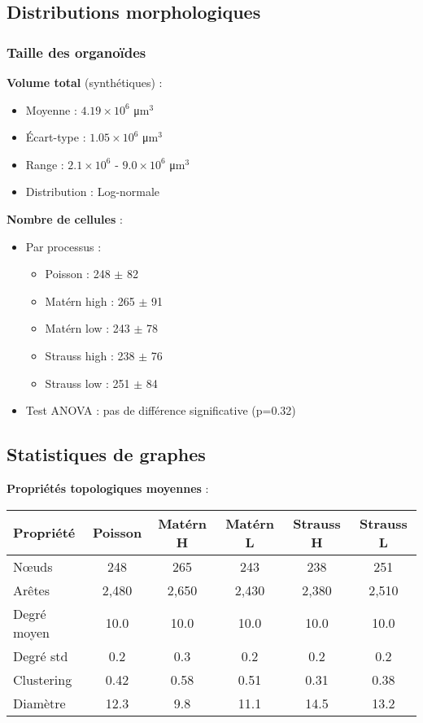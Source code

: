 \subsection{Distributions morphologiques}

\subsubsection{Taille des organoïdes}

\textbf{Volume total} (synthétiques) :
\begin{itemize}
    \item Moyenne : $4.19 \times 10^6$ μm$^3$
    \item Écart-type : $1.05 \times 10^6$ μm$^3$
    \item Range : $2.1 \times 10^6$ - $9.0 \times 10^6$ μm$^3$
    \item Distribution : Log-normale
\end{itemize}

\textbf{Nombre de cellules} :
\begin{itemize}
    \item Par processus :
        \begin{itemize}
            \item Poisson : 248 $\pm$ 82
            \item Matérn high : 265 $\pm$ 91
            \item Matérn low : 243 $\pm$ 78
            \item Strauss high : 238 $\pm$ 76
            \item Strauss low : 251 $\pm$ 84
        \end{itemize}
    \item Test ANOVA : pas de différence significative (p=0.32)
\end{itemize}

\subsection{Statistiques de graphes}

\textbf{Propriétés topologiques moyennes} :

\begin{tabular}{lccccc}
\hline
Propriété & Poisson & Matérn H & Matérn L & Strauss H & Strauss L \\
\hline
Nœuds & 248 & 265 & 243 & 238 & 251 \\
Arêtes & 2,480 & 2,650 & 2,430 & 2,380 & 2,510 \\
Degré moyen & 10.0 & 10.0 & 10.0 & 10.0 & 10.0 \\
Degré std & 0.2 & 0.3 & 0.2 & 0.2 & 0.2 \\
Clustering & 0.42 & 0.58 & 0.51 & 0.31 & 0.38 \\
Diamètre & 12.3 & 9.8 & 11.1 & 14.5 & 13.2 \\
\hline
\end{tabular}

